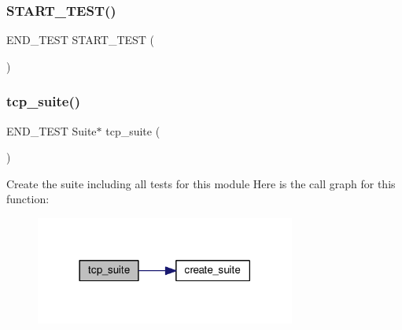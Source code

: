 \subsubsection{\texorpdfstring{S\+T\+A\+R\+T\+\_\+\+T\+E\+S\+T()}{START\_TEST()}\hspace{0.1cm}{\footnotesize\ttfamily [8/8]}}
{\footnotesize\ttfamily E\+N\+D\+\_\+\+T\+E\+ST S\+T\+A\+R\+T\+\_\+\+T\+E\+ST (\begin{DoxyParamCaption}\item[{test\+\_\+tcp\+\_\+tx\+\_\+full\+\_\+window\+\_\+lost\+\_\+from\+\_\+unacked}]{ }\end{DoxyParamCaption})}

\mbox{\label{openmote-cc2538_2lwip_2test_2unit_2tcp_2test__tcp_8c_ab679db758522f8fafb4808dc4aae2e8d}} 
\subsubsection{\texorpdfstring{tcp\+\_\+suite()}{tcp\_suite()}}
{\footnotesize\ttfamily E\+N\+D\+\_\+\+T\+E\+ST Suite$\ast$ tcp\+\_\+suite (\begin{DoxyParamCaption}\item[{void}]{ }\end{DoxyParamCaption})}

Create the suite including all tests for this module Here is the call graph for this function\+:
\nopagebreak
\begin{figure}[H]
\begin{center}
\leavevmode
\includegraphics[width=242pt]{openmote-cc2538_2lwip_2test_2unit_2tcp_2test__tcp_8c_ab679db758522f8fafb4808dc4aae2e8d_cgraph}
\end{center}
\end{figure}
